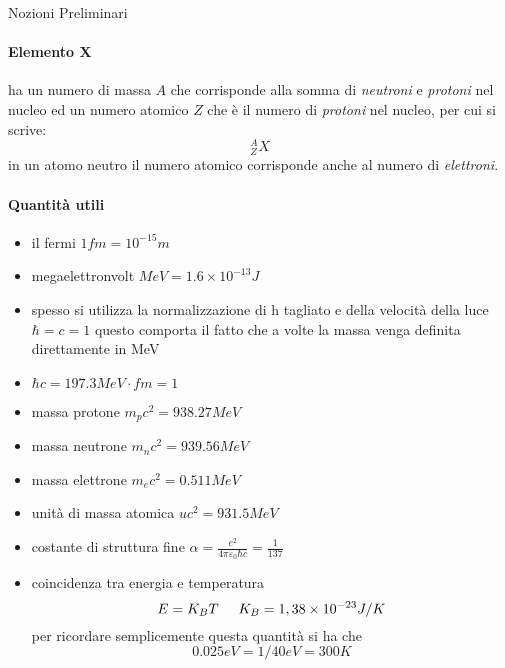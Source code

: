 \begin{center}
\begin{huge}
Nozioni Preliminari
\end{huge}
\end{center}
\vspace{1cm}

\paragraph{Elemento X} ha un numero di massa $A$ che corrisponde alla somma di \emph{neutroni} e \emph{protoni} nel nucleo ed un numero atomico $Z$ che è il numero di \emph{protoni} nel nucleo, per cui si scrive:
$$^{A}_{Z} X$$
in un atomo neutro il numero atomico corrisponde anche al numero di \emph{elettroni}.

\paragraph{Quantità utili}
\begin{itemize}
\item il fermi $1fm=10^{-15}m$
\item megaelettronvolt $MeV=1.6\times 10^{-13}J$
\item spesso si utilizza la normalizzazione di h tagliato e della velocità della luce $\hbar=c=1$  questo comporta il fatto che a volte la massa venga definita direttamente in MeV
\item $\hbar c=197.3MeV\cdot fm=1$
\item massa protone $m_pc^2=938.27MeV$
\item massa neutrone $m_nc^2=939.56 MeV$
\item massa elettrone $m_ec^2=0.511MeV$
\item unità di massa atomica $uc^2=931.5MeV$
\item costante di struttura fine $\alpha=\frac{e^2}{4\pi\varepsilon_0\hbar c}=\frac{1}{137}$
\item coincidenza tra energia e temperatura \[E=K_B T \hspace{0.5cm} K_B=1,38 \times 10^{-23}J/K\] per ricordare semplicemente questa quantità si ha che \[0.025eV=1/40eV=300K\]
\end{itemize}



\newpage
